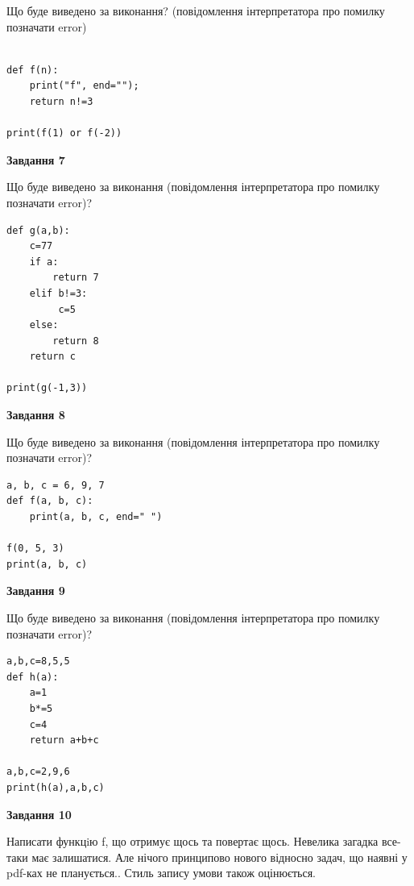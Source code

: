 \documentclass[12pt, ukrainian]{article}
\begin{document}
{\begin {large}
Що буде виведено за виконання? (повідомлення інтерпретатора про помилку позначати error)\par
\begin{verbatim}

def f(n):
    print("f", end="");
    return n!=3

print(f(1) or f(-2))
\end{verbatim}

{\begin {center}\textbf{Завдання 7}\end {center}}

Що буде виведено за виконання (повідомлення інтерпретатора про помилку позначати error)?\par
\begin{verbatim}
def g(a,b):
    c=77
    if a:
        return 7
    elif b!=3:
         c=5
    else: 
        return 8
    return c

print(g(-1,3))
\end{verbatim}

{\begin {center}\textbf{Завдання 8}\end {center}}

Що буде виведено за виконання (повідомлення інтерпретатора про помилку позначати error)?\par
\begin{verbatim}
a, b, c = 6, 9, 7
def f(a, b, c):
    print(a, b, c, end=" ")

f(0, 5, 3)
print(a, b, c)
\end{verbatim}

{\begin {center}\textbf{Завдання 9}\end {center}}

Що буде виведено за виконання (повідомлення інтерпретатора про помилку позначати error)?\par
\begin{verbatim}
a,b,c=8,5,5
def h(a):
    a=1
    b*=5
    c=4
    return a+b+c

a,b,c=2,9,6
print(h(a),a,b,c)
\end{verbatim}

{\begin {center}\textbf{Завдання 10}\end {center}}


Написати функцiю f, що отримує щось та повертає щось. Невелика загадка все-таки має залишатися. Але нічого принципово нового відносно задач, що наявні у pdf-ках не планується.. Стиль запису умови також оцінюється.\par
\end {large}}
\newpage
\end{document}
